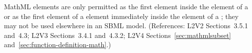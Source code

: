 MathML  elements are only permitted as the first element
inside the  element of a \FunctionDefinition or as the
first element of a  element immediately inside the
 element of a \FunctionDefinition; they may not be used
elsewhere in an SBML model.  (References: L2V2 Sections~3.5.1 and~4.3;
L2V3 Sections~3.4.1 and~4.3.2; L2V4 Sections~\ref{sec:mathmlsubset}
and~\ref{sec:function-definition-math}.)

